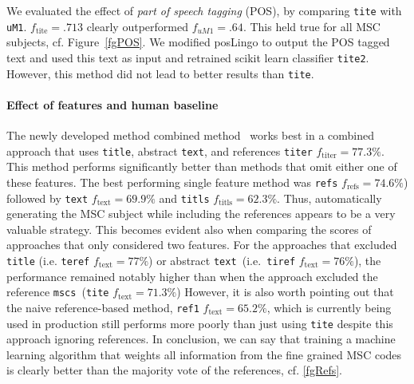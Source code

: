 We evaluated the effect of \emph{part of speech tagging} (POS), by comparing \texttt{tite} with \texttt{uM1}. \(f_{\mathrm{tite}} = .713\) clearly outperformed \(f_{uM1} = .64.\)
This held true for all MSC subjects, cf. Figure~\ref{fgPOS}.
We modified posLingo to output the POS tagged text and used this text as input and retrained scikit learn classifier \texttt{tite2}.
However, this method did not lead to better results than \texttt{tite}.

\paragraph{Effect of features and human baseline}
The newly developed method combined method~\cite{Scharpf2020} works best in a combined approach that uses \texttt{title}, abstract \texttt{text}, and references \texttt{titer} \(f_{\mathrm{titer}} = 77.3\%.\)
This method performs significantly better than methods that omit either one of these features.
The best performing single feature method was \texttt{refs} \(f_{\mathrm{refs}} = 74.6\%\)) followed by \texttt{text} \(f_{\mathrm{text}} = 69.9\%\) and \texttt{titls} \(f_{\mathrm{titls}} = 62.3\%\).
Thus, automatically generating the MSC subject while including the references appears to be a very valuable strategy.
This becomes evident also when comparing the scores of approaches that only considered two features. For the approaches that excluded \texttt{title} (i.e. \texttt{teref} \(f_{\mathrm{text}} = 77\%\)) or abstract \texttt{text}\texttt{\ }(i.e.\texttt{\ }\texttt{tiref} \(f_{\mathrm{text}} = 76\%\)), the performance remained notably higher than when the approach excluded the reference \texttt{mscs}\ (\texttt{tite} \(f_{\mathrm{text}} = 71.3\%\))
However, it is also worth pointing out that the naive reference-based method, \texttt{ref1} \(f_{\mathrm{text}} = 65.2\%\), which is currently being used in production still performs more poorly than just using \texttt{tite} despite this approach ignoring references.
In conclusion, we can say that training a machine learning algorithm that weights all information from the fine grained MSC codes is clearly better than the majority vote of the references, cf. \ref{fgRefs}.



